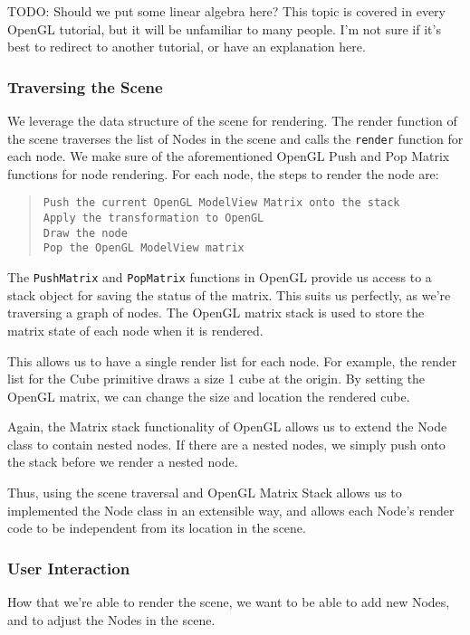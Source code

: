 \documentclass[11pt,draft]{article}
\begin{document}
TODO: Should we put some linear algebra here? This topic is covered in every OpenGL tutorial, but it will be unfamiliar to many people. I'm not sure if it's best to redirect to another tutorial,
or have an explanation here.


\subsubsection{Traversing the Scene}
We leverage the data structure of the scene for rendering. The render function of the scene traverses the list of Nodes in the scene and
calls the \lstinline$render$ function for each node. We make sure of the aforementioned OpenGL Push and Pop Matrix functions for node rendering.
For each node, the steps to render the node are:

\begin{quote}
\texttt{Push the current OpenGL ModelView Matrix onto the stack}\\
\texttt{Apply the transformation to OpenGL}\\
\texttt{Draw the node}\\
\texttt{Pop the OpenGL ModelView matrix}\\
\end{quote}

The \lstinline$PushMatrix$ and \lstinline$PopMatrix$ functions in OpenGL provide us access to a stack object for saving the status of the matrix.
This suits us perfectly, as we're traversing a graph of nodes.
The OpenGL matrix stack is used to store the matrix state of each node when it is rendered.

This allows us to have a single render list for each node. For example, the render list for the Cube primitive draws a size 1 cube at the origin.
By setting the OpenGL matrix, we can change the size and location the rendered cube.

Again, the Matrix stack functionality of OpenGL allows us to extend the Node class to contain nested nodes. If there are a nested nodes, we simply
push onto the stack before we render a nested node.

Thus, using the scene traversal and OpenGL Matrix Stack allows us to implemented the Node class in an extensible way, and allows each Node's render code
to be independent from its location in the scene.


\subsubsection{User Interaction}
How that we're able to render the scene, we want to be able to add new Nodes, and to adjust the Nodes in the scene.
\end{document}

